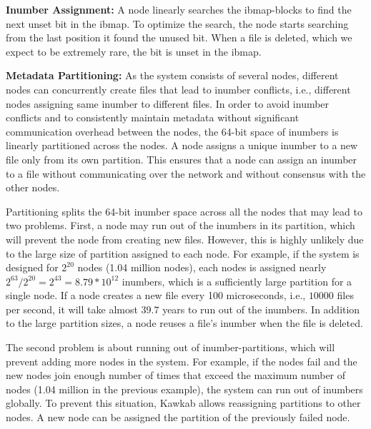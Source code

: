 \documentclass[]{article}
\newcommand{\subtopic}[1]{\vspace{1.5pt} \noindent \textbf{#1}}
\begin{document}
\subtopic{Inumber Assignment:}
A node linearly searches the ibmap-blocks to find the next unset bit in the ibmap.
To optimize the search, the node starts searching from the last position it
found the unused bit. When a file is deleted, which we expect to be extremely
rare, the bit is unset in the ibmap.



\subtopic{Metadata Partitioning:} As the system consists of several nodes,
different nodes can concurrently create files that lead to inumber conflicts,
i.e., different nodes assigning same inumber to different files.  In order to
avoid inumber conflicts and to  consistently maintain metadata without
significant communication overhead between the nodes, the 64-bit space of
inumbers is linearly partitioned across the nodes. A node assigns a unique
inumber to a new file only from its own partition. This ensures that a node can
assign an inumber to a file without communicating over the network and without
consensus with the other nodes.

Partitioning splits the 64-bit inumber space across all the nodes that may lead to
two problems. First, a node may run out of the inumbers in its partition, which
will prevent the node from creating new files.  However, this is highly
unlikely due to the large size of partition assigned to each node. For example, if
the system is designed for $2^{20}$ nodes (1.04 million nodes), each nodes is
assigned nearly $2^{63} / 2^{20} = 2^{43} = 8.79 * 10^{12}$ inumbers, which is a
sufficiently large partition for a single node. If a node creates a new file
every 100 microseconds, i.e., $10000$ files per second, it will take almost
$39.7$ years to run out of the inumbers. In addition to the large partition
sizes, a node reuses a file's inumber when the file is deleted.

The second problem is about running out of inumber-partitions, which will
prevent adding more nodes in the system. For example, if the nodes fail and the
new nodes join enough number of times that exceed the maximum number of nodes
(1.04 million in the previous example), the system can run out of inumbers
globally. To prevent this situation, Kawkab allows reassigning partitions to
other nodes. A new node can be assigned the partition of the previously failed
node.
\end{document}
